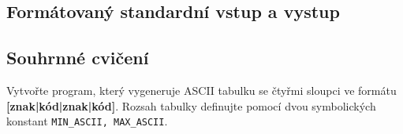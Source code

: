     \subsection{Formátovaný standardní vstup a vystup}
    \subsection{Souhrnné cvičení}
      \begin{example}Vytvořte program, který vygeneruje ASCII tabulku se čtyřmi sloupci ve formátu 
      \textbf{[znak|kód|znak|kód]}. Rozsah tabulky definujte pomocí dvou symbolických konstant 
      \lstinline[basicstyle=\ttfamily]!MIN_ASCII, MAX_ASCII!. 
  
        
      \end{example} 

\printbibliography[title={Seznam literatury}, heading=subbibliography]
